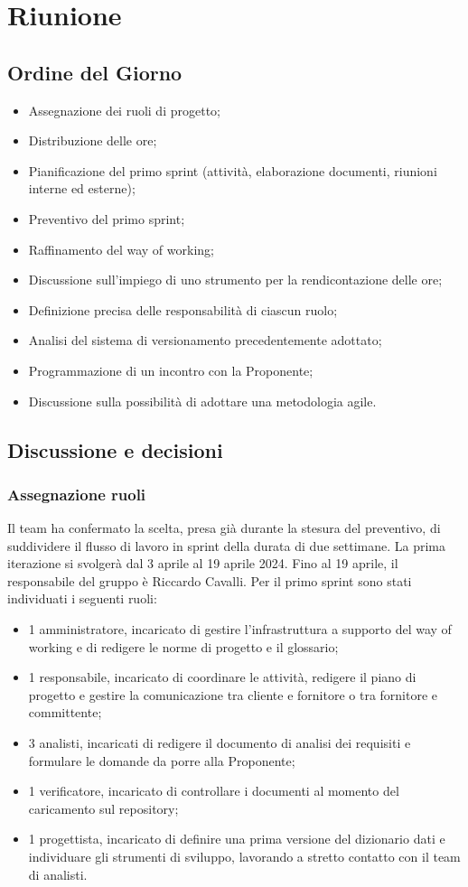 \section{Riunione}
\subsection{Ordine del Giorno}
\begin{itemize}
	\item Assegnazione dei ruoli di progetto;
	\item Distribuzione delle ore;
	\item Pianificazione del primo sprint (attività, elaborazione documenti, riunioni interne ed esterne);
	\item Preventivo del primo sprint;
	\item Raffinamento del way of working;
	\item Discussione sull'impiego di uno strumento per la rendicontazione delle ore;
	\item Definizione precisa delle responsabilità di ciascun ruolo;
	\item Analisi del sistema di versionamento precedentemente adottato;
	\item Programmazione di un incontro con la Proponente;
	\item Discussione sulla possibilità di adottare una metodologia agile.
\end{itemize}

\subsection{Discussione e decisioni}

\subsubsection{Assegnazione ruoli}
Il team ha confermato la scelta, presa già durante la stesura del preventivo, di suddividere il flusso di lavoro in sprint della durata di due settimane. La prima iterazione si svolgerà dal 3 aprile al 19 aprile 2024. Fino al 19 aprile, il responsabile del gruppo è Riccardo Cavalli. Per il primo sprint sono stati individuati i seguenti ruoli:
\begin{itemize}
	\item 1 amministratore, incaricato di gestire l'infrastruttura a supporto del way of working e di redigere le norme di progetto e il glossario;
	\item 1 responsabile, incaricato di coordinare le attività, redigere il piano di progetto e gestire la comunicazione tra cliente e fornitore o tra fornitore e committente;
	\item 3 analisti, incaricati di redigere il documento di analisi dei requisiti e formulare le domande da porre alla Proponente;
	\item 1 verificatore, incaricato di controllare i documenti al momento del caricamento sul repository;
	\item 1 progettista, incaricato di definire una prima versione del dizionario dati e individuare gli strumenti di sviluppo, lavorando a stretto contatto con il team di analisti.
\end{itemize}

